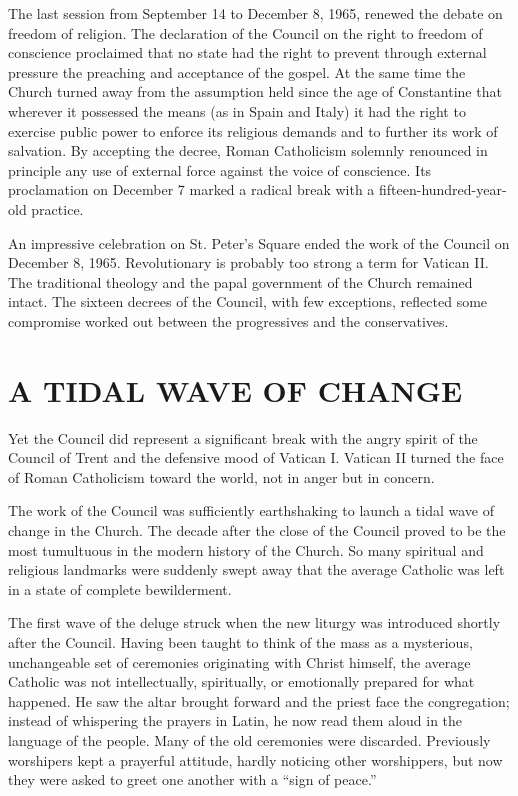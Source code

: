 The last session from September 14 to December 8, 1965, renewed the debate on freedom of religion.
The declaration of the Council on the right to freedom of conscience proclaimed that no state had
the right to prevent through external pressure the preaching and acceptance of the gospel. At the
same time the Church turned away from the assumption held since the age of Constantine that wherever
it possessed the means (as in Spain and Italy) it had the right to exercise public power to enforce
its religious demands and to further its work of salvation. By accepting the decree, Roman
Catholicism solemnly renounced in principle any use of external force against the voice of
conscience. Its proclamation on December 7 marked a radical break with a fifteen-hundred-year-old
practice.

An impressive celebration on St. Peter’s Square ended the work of the Council on December 8, 1965.
Revolutionary is probably too strong a term for Vatican II. The traditional theology and the papal
government of the Church remained intact. The sixteen decrees of the Council, with few exceptions,
reflected some compromise worked out between the progressives and the conservatives.

\section{A TIDAL WAVE OF CHANGE}

Yet the Council did represent a significant break with the angry spirit of the Council of Trent and
the defensive mood of Vatican I. Vatican II turned the face of Roman Catholicism toward the world,
not in anger but in concern.

The work of the Council was sufficiently earthshaking to launch a tidal wave of change in the
Church. The decade after the close of the Council proved to be the most tumultuous in the modern
history of the Church. So many spiritual and religious landmarks were suddenly swept away that the
average Catholic was left in a state of complete bewilderment.

The first wave of the deluge struck when the new liturgy was introduced shortly after the Council.
Having been taught to think of the mass as a mysterious, unchangeable set of ceremonies originating
with Christ himself, the average Catholic was not intellectually, spiritually, or emotionally
prepared for what happened. He saw the altar brought forward and the priest face the congregation;
instead of whispering the prayers in Latin, he now read them aloud in the language of the people.
Many of the old ceremonies were discarded. Previously worshipers kept a prayerful attitude, hardly
noticing other worshippers, but now they were asked to greet one another with a “sign of peace.”

